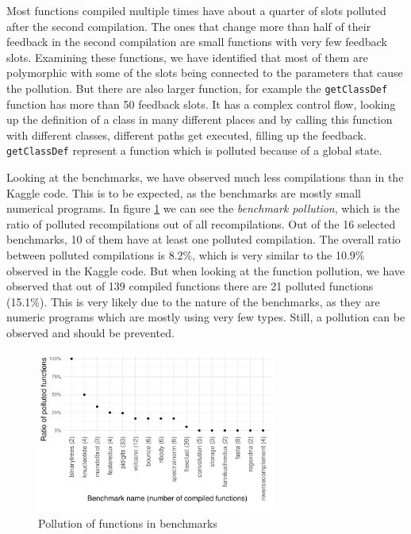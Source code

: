 Most functions compiled multiple times have about a quarter of slots polluted after the second compilation. The ones that change more than half of their feedback in the second compilation are small functions with very few feedback slots. Examining these functions, we have identified that most of them are polymorphic with some of the slots being connected to the parameters that cause the pollution. But there are also larger function, for example the \texttt{getClassDef} function has more than 50 feedback slots. It has a complex control flow, looking up the definition of a class in many different places and by calling this function with different classes, different paths get executed, filling up the feedback. \texttt{getClassDef} represent a function which is polluted because of a global state.

Looking at the benchmarks, we have observed much less compilations than in the Kaggle code. This is to be expected, as the benchmarks are mostly small numerical programs. In figure \ref{fig:bench-pollution} we can see the \textit{benchmark pollution}, which is the ratio of polluted recompilations out of all recompilations. Out of the 16 selected benchmarks, 10 of them have at least one polluted compilation. The overall ratio between polluted compilations is 8.2\%, which is very similar to the 10.9\% observed in the Kaggle code. But when looking at the function pollution, we have observed that out of 139 compiled functions there are 21 polluted functions (15.1\%). This is very likely due to the nature of the benchmarks, as they are numeric programs which are mostly using very few types. Still, a pollution can be observed and should be prevented.

\begin{figure}
	\centering
	\includegraphics[width=0.7\textwidth]{figures/pollution/master/benchmark-pollutionBW.pdf}
	\caption{Pollution of functions in benchmarks\cite{feedback-vmil}}\label{fig:bench-pollution}
\end{figure}

